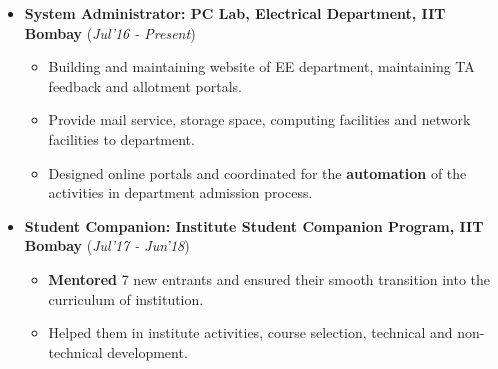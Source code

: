 \documentclass[10pt]{article}
\begin{document}
	
	\vspace{0.15cm}
	

\colorbox{bl}{}

\begin{itemize}[leftmargin=0.4cm]
\vspace{-0.1cm}
\item \textbf {System Administrator: PC Lab, Electrical Department, IIT Bombay} 
\hfill{(\textit{Jul'16 - Present})}\\[-0.6cm]
    \begin{itemize}
	\item Building and maintaining website of EE department, maintaining TA feedback and allotment portals.\vspace{-0.1cm}
	\item Provide mail service, storage space, computing facilities and network facilities to department.\vspace{-0.1cm}
	\item Designed online portals and coordinated for the \textbf{automation} of the activities in department admission process.
	\end{itemize}
	\vspace{-0.25cm}
	
	
\item \textbf{Student Companion: Institute Student Companion Program, IIT Bombay}
\hfill{(\textit{Jul'17 - Jun'18})}\\[-0.6cm]
    \begin{itemize}
			\item \textbf{Mentored} 7 new entrants and ensured their smooth transition into the curriculum of institution.\vspace{-0.1cm}
            \item Helped them in institute activities, course selection, technical and non-technical development.
		\end{itemize}
		\vspace{-0.25cm}
	

\end{itemize}
\end{document}
